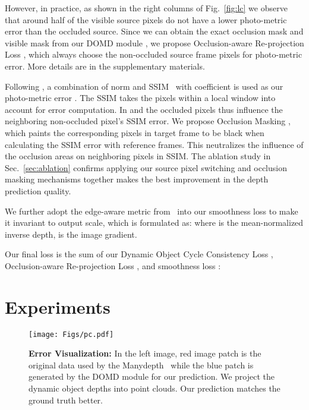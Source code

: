\documentclass[runningheads]{llncs}
\begin{document}
However, in practice, as shown in the right columns of Fig.~\ref{fig:lc} we observe that around half of the visible source pixels do not have a lower photo-metric error than the occluded source. Since we can obtain the exact occlusion mask  and visible mask  from our DOMD module , we propose Occlusion-aware Re-projection Loss , which always choose the non-occluded source frame pixels for photo-metric error. More details are in the supplementary materials.


Following \cite{monodepth,peloss}, a combination of  norm and SSIM~\cite{ssim} with coefficient  is used as our photo-metric error . The SSIM takes the pixels within a local window into account for error computation. In  and  the occluded pixels thus influence the neighboring non-occluded pixel's SSIM error. We propose Occlusion Masking , which paints the corresponding pixels in target frame  to be black when calculating the SSIM error with reference frames. This neutralizes the influence of the occlusion areas on neighboring pixels in SSIM. The ablation study in Sec.~\ref{sec:ablation} confirms applying our source pixel switching and occlusion masking mechanisms together makes the best improvement in the depth prediction quality.


We further adopt the edge-aware metric from~\cite{ddvo} into our smoothness loss  to make it invariant to output scale, which is formulated as:
 where  is the mean-normalized inverse depth,  is the image gradient.

Our final loss  is the sum of our Dynamic Object Cycle Consistency Loss , Occlusion-aware Re-projection Loss , and smoothness loss :



\section{Experiments}
\label{sec:exp}


\begin{figure*}[t]
\centering
\texttt{[image: Figs/pc.pdf]}
\caption{\textbf{Error Visualization: }In the left  image, {\color{red}red} image patch is the original data used by the Manydepth~\cite{manydepth} while the {\color{blue}blue} patch is generated by the DOMD module for our prediction. We project the dynamic object depths into point clouds. Our prediction matches the ground truth better.}
\label{fig:pcl}
\end{figure*}


\newcommand{\x}{ x }
\newcommand{\midline}{  }
\end{document}
